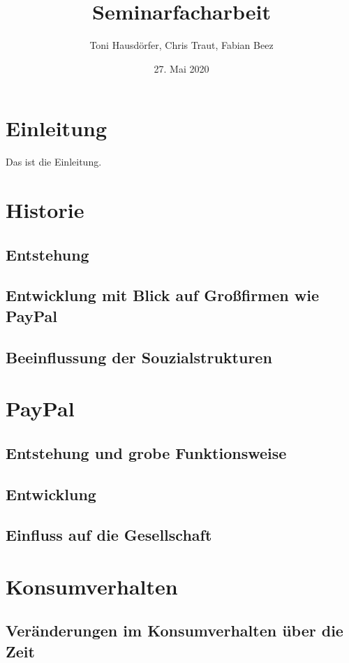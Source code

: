 \documentclass[a4paper, 10pt]{scrartcl}
\title{Seminarfacharbeit}
\author{Toni Hausdörfer, Chris Traut, Fabian Beez}
\date{27. Mai 2020}
\begin{document}
    
    \maketitle
    \newpage
    \tableofcontents
    \newpage

    \section{Einleitung}
    Das ist die Einleitung. 
    \newpage
    
    \section{Historie}
        \subsection{Entstehung}
        \subsection{Entwicklung mit Blick auf Großfirmen wie PayPal}
        \subsection{Beeinflussung der Souzialstrukturen}
    \newpage
        
    \section{PayPal}
        \subsection{Entstehung und grobe Funktionsweise}
        \subsection{Entwicklung}
        \subsection{Einfluss auf die Gesellschaft}
    \newpage
        
    \section{Konsumverhalten}
        \subsection{Veränderungen im Konsumverhalten über die Zeit}
\end{document}
